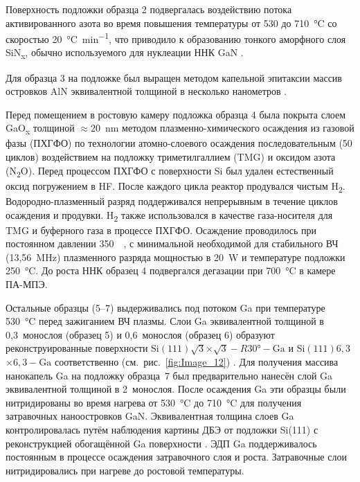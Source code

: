 Поверхность подложки образца 2 подвергалась воздействию потока активированного
азота во время повышения температуры от 530 до 710~\si{\degreeCelsius} со
скоростью 20~\si{\degreeCelsius\per\minute}, что приводило к образованию
тонкого аморфного слоя SiN\textsubscript{x}, обычно используемого для нуклеации
ННК GaN \cite{Wierzbicka2013}.

Для образца 3 на подложке был выращен методом капельной эпитаксии массив островков AlN эквивалентной толщиной в несколько нанометров \cite{Bolshakov2018}.

Перед помещением в ростовую камеру подложка образца 4 была покрыта слоем
GaO\textsubscript{x} толщиной \(\approx 20\)~\si{\nano\meter} методом
плазменно-химического осаждения из газовой фазы (ПХГФО) по технологии
атомно-слоевого осаждения \cite{Altuntas2014, Ramachandran2014}
последовательным (50 циклов) воздействием на подложку триметилгаллием (TMG) и
оксидом азота (N\textsubscript{2}O). Перед процессом ПХГФО с поверхности Si был
удален естественный оксид погружением в HF. После каждого цикла реактор
продувался чистым H\textsubscript{2}. Водородно-плазменный разряд поддерживался
непрерывным в течение циклов осаждения и продувки. H\textsubscript{2} также
использовался в качестве газа-носителя для TMG и буферного газа в процессе
ПХГФО. Осаждение проводилось при постоянном давлении 350~\si{\milli\torr}, с
минимальной необходимой для стабильного ВЧ (13,56~\si{\mega\hertz}) плазменного
разряда мощностью в 20~\si{\watt} и температуре подложки
250~\si{\degreeCelsius}. До роста ННК образец 4 подвергался дегазации при
700~\si{\degreeCelsius} в камере ПА-МПЭ.

Остальные образцы (5--7) выдерживались под потоком Ga при температуре
530~\si{\degreeCelsius} перед зажиганием ВЧ плазмы. Слои Ga эквивалентной
толщиной в 0,3~монослоя (образец 5) и 0,6~монослоя (образец 6) образуют
реконструированные поверхности  Si\((111)\sqrt{3}\)\(\times\)\(\sqrt{3} -
R30\si{\degree} - \text{Ga}\) и Si\((111)6,3\)\(\times\)\(6,3 - \text{Ga}\)
соответственно (см.~рис.~\cref{fig:Image_12}) \cite{Park1988}. Для получения
массива нанокапель Ga на подложку образца~7 был предварительно нанесён слой Ga
эквивалентной толщиной в 2~монослоя. После осаждения Ga эти образцы были
нитридированы во время нагрева от 530~\si{\degreeCelsius} до
710~\si{\degreeCelsius} для получения затравочных наноостровков GaN.
Эквивалентная толщина слоев Ga контролировалась путём наблюдения картины ДБЭ от
подложки Si(111) с реконструкцией обогащённой Ga поверхности
\cite{Fedorov2018}. ЭДП Ga поддерживалось постоянным в процессе осаждения
затравочного слоя и роста. Затравочные слои нитридировались при нагреве до
ростовой температуры.

